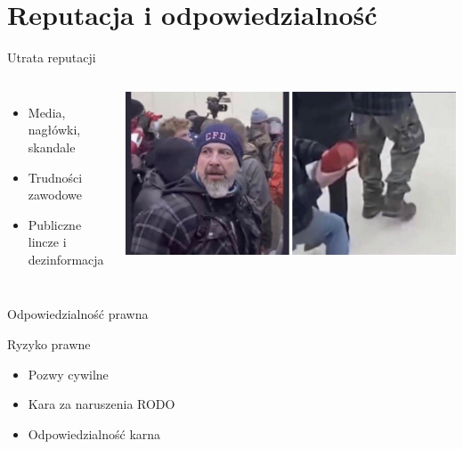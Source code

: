 \section{Reputacja i odpowiedzialność}
\begin{frame}{Utrata reputacji}
\begin{columns}[c]
    \begin{itemize}
      \item Media, nagłówki, skandale
      \item Trudności zawodowe
      \item Publiczne lincze i dezinformacja
    \end{itemize}
    \includegraphics[width=1\textwidth]{images/david.jpg}
\end{columns}
\end{frame}

\begin{frame}{Odpowiedzialność prawna}
    \begin{block}{Ryzyko prawne}
        \begin{itemize}
        \item Pozwy cywilne
        \item Kara za naruszenia RODO
        \item Odpowiedzialność karna
        \end{itemize}
    \end{block}
\end{frame}
